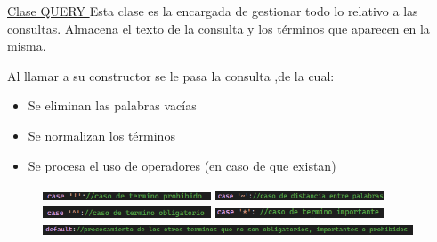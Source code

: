     \begin{frame}
        \begin{block}{\underline{Clase QUERY    }}
            Esta clase es la encargada de gestionar todo lo relativo a las consultas. Almacena el texto de la consulta y los términos que aparecen en la misma. 
                  
            \begin{beamerboxesrounded}{\color{red}Al llamar a su constructor se le pasa la consulta ,de la cual:}
\begin{itemize}
    \item Se eliminan las palabras vacías
    \item Se normalizan los términos
    \item Se procesa el uso de operadores (en caso de que existan)
\end{itemize}        
            \end{beamerboxesrounded}
\begin{figure}
    \includegraphics[width=50mm]{Imagen2.png}
    \includegraphics[width=50mm]{Imagen3.png}
    \includegraphics[width=50mm]{Imagen4.png}
    \includegraphics[width=50mm]{Imagen5.png}
    \includegraphics[width=110mm]{Imagen6.png}
\end{figure}               
        \end{block}
    \end{frame}

